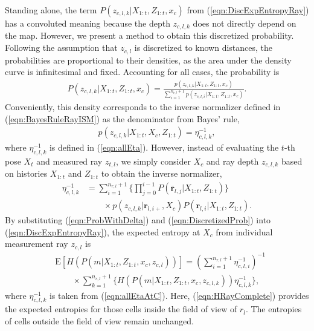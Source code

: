 \documentclass[letterpaper, 10pt, conference]{ieeeconf}
\newcommand{\refeqn}[1]{(\ref{eqn:#1})}
\begin{document}
Standing alone, the term $P(z_{c,l,k}|X_{1:t},Z_{1:t},x_c)$ from \refeqn{DiscExpEntropyRay} has a convoluted meaning because the depth $z_{c,l,k}$ does not directly depend on the map. However, we present a method to obtain this discretized probability. %
Following the assumption that $z_{c,l}$ is discretized to known distances, the probabilities are proportional to their densities, as the area under the density curve is infinitesimal and fixed. Accounting for all cases, the probability is
\begin{align}
\label{eqn:ProbWithDelta}
P(z_{c,l,k}|X_{1:t},Z_{1:t},x_c)=\frac{p(z_{c,l,k}|X_{1:t},Z_{1:t},x_c)}{\sum_{i=1}^{n_{r,l}+1}p(z_{c,l,i}|X_{1:t},Z_{1:t},x_c)}.
\end{align}
Conveniently, this density corresponds to the inverse normalizer defined in \refeqn{BayesRuleRayISM} as the denominator from Bayes' rule,
\begin{align}
\label{eqn:DiscretizedProb}
p(z_{c,l,k}|X_{1:t},X_c,Z_{1:t})=\eta_{c,l,k}^{-1},
\end{align}
where $\eta_{c,l,k}^{-1}$ is defined in \refeqn{allEta}. However, instead of evaluating the $t$-th pose $X_t$ and measured ray $z_{t,l}$, we simply consider $X_c$ and ray depth $z_{c,l,k}$ based on histories $X_{1:t}$ and $Z_{1:t}$ to obtain the inverse normalizer,
\begin{align}
\label{eqn:allEtaAtC}
\eta_{c,l,k}^{-1}
&=
\sum_{i=1}^{n_{r,l}+1}\bigg\{\prod_{j=0}^{i-1}P(\bar{\mathbf{r}}_{l,j}|X_{1:t},Z_{1:t})\bigg\}\nonumber\\&\qquad\times p(z_{c,l,k}|\mathbf{r}_{l,i+},X_c)P(\mathbf{r}_{l,i}|X_{1:t},Z_{1:t}).
\end{align}
By substituting \refeqn{ProbWithDelta} and \refeqn{DiscretizedProb} into \refeqn{DiscExpEntropyRay}, the expected entropy at $X_c$ from individual measurement ray $z_{c,l}$ is
\begin{align}
\label{eqn:HRayComplete}
&\text{E}[H(P(m|X_{1:t},Z_{1:t},x_c,z_{c,l}))]=\left(\sum_{i=1}^{n_{r,l}+1}\eta_{c,l,i}^{-1}\right)^{-1}\nonumber\\&\quad\quad\times\sum_{k=1}^{n_{r,l}+1}\bigg\{H(P(m|X_{1:t},Z_{1:t},x_c,z_{c,l,k}))\eta_{c,l,k}^{-1}\bigg\},
\end{align}
where $\eta_{c,l,k}^{-1}$ is taken from \refeqn{allEtaAtC}.
Here, \refeqn{HRayComplete} provides the expected entropies for those cells inside the field of view of $r_l$. %
The entropies of cells outside the field of view remain unchanged.
\end{document}
